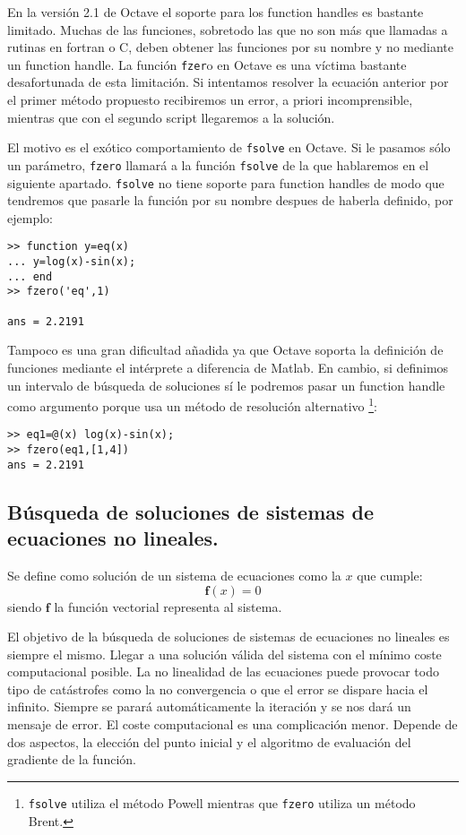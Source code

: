 En la versión 2.1 de Octave el soporte para los function handles es
bastante limitado. Muchas de las funciones, sobretodo las que no son
más que llamadas a rutinas en fortran o C, deben obtener las funciones
por su nombre y no mediante un function handle. La función
\texttt{fzer}o en Octave es una víctima bastante desafortunada de esta
limitación.  Si intentamos resolver la ecuación anterior por el primer
método propuesto recibiremos un error, a priori incomprensible,
mientras que con el segundo script llegaremos a la solución.

El motivo es el exótico comportamiento de \texttt{fsolve} en Octave.
Si le pasamos sólo un parámetro, \texttt{fzero} llamará a la función
\texttt{fsolve} de la que hablaremos en el siguiente apartado.
\texttt{fsolve} no tiene soporte para function handles de modo que
tendremos que pasarle la función por su nombre despues de haberla
definido, por ejemplo:

  \begin{verbatim}
>> function y=eq(x)
... y=log(x)-sin(x);
... end
>> fzero('eq',1)

ans = 2.2191
\end{verbatim}
Tampoco es una gran dificultad añadida ya que Octave soporta la
definición de funciones mediante el intérprete a diferencia de Matlab.
En cambio, si definimos un intervalo de búsqueda de soluciones sí le
podremos pasar un function handle como argumento porque usa un método
de resolución alternativo%
\footnote{\texttt{fsolve} utiliza el método Powell mientras que
  \texttt{fzero} utiliza un método Brent.%
}:

  \begin{verbatim}
>> eq1=@(x) log(x)-sin(x);
>> fzero(eq1,[1,4])
ans = 2.2191 
\end{verbatim}

\subsection{Búsqueda de soluciones de sistemas de ecuaciones no
  lineales.}

Se define como solución de un sistema de ecuaciones como la $x$ que
cumple:\[ \mathbf{f}(x)=0\] siendo $\mathbf{f}$ la función vectorial
representa al sistema.

El objetivo de la búsqueda de soluciones de sistemas de ecuaciones no
lineales es siempre el mismo. Llegar a una solución válida del sistema
con el mínimo coste computacional posible. La no linealidad de las
ecuaciones puede provocar todo tipo de catástrofes como la no
convergencia o que el error se dispare hacia el infinito. Siempre se
parará automáticamente la iteración y se nos dará un mensaje de error.
El coste computacional es una complicación menor. Depende de dos
aspectos, la elección del punto inicial y el algoritmo de evaluación
del gradiente de la función.

